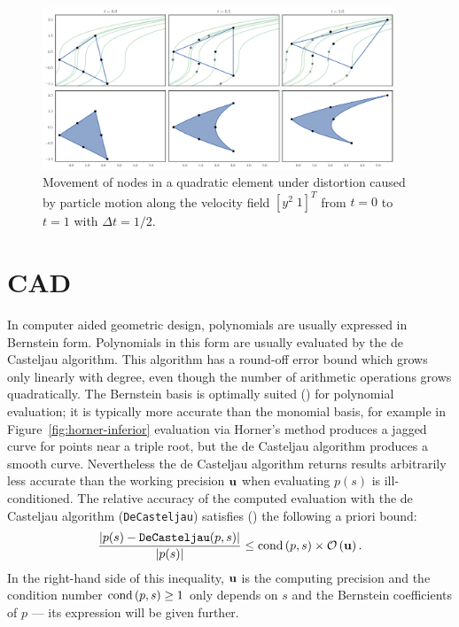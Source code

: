 \begin{figure}
  \includegraphics[width=0.9375\textwidth]
                  {../images/curved-mesh/element_distortion.pdf}
  \centering
  \caption{Movement of nodes in a quadratic element under distortion caused
    by particle motion along the velocity field \(\left[ y^2 \; 1 \right]^T\)
    from \(t = 0\) to \(t = 1\) with \(\Delta t = 1/2\).}
  \label{fig:element-distortion}
\end{figure}

\section{CAD}

In computer aided geometric design, polynomials are usually expressed in
Bernstein form. Polynomials in this form are usually evaluated by the
de Casteljau algorithm. This algorithm has a round-off error bound
which grows only linearly with degree, even though the number of
arithmetic operations grows quadratically. The Bernstein basis is
optimally suited (\cite{Farouki1987, Delgado2015, Mainar2005})
for polynomial evaluation; it is
typically more accurate than the monomial basis, for example in
Figure~\ref{fig:horner-inferior} evaluation via Horner's method produces
a jagged curve for points near a triple root, but the de Casteljau algorithm
produces a smooth curve. Nevertheless the de Casteljau
algorithm returns results arbitrarily less accurate than the working
precision \(\mathbf{u}\) when evaluating \(p(s)\) is ill-conditioned.
The relative accuracy of the computed
evaluation with the de Casteljau algorithm (\texttt{DeCasteljau}) satisfies
(\cite{Mainar1999}) the following a priori bound:
\begin{equation}\label{de-casteljau-error}
  \frac{\left|p(s) - \mathtt{DeCasteljau}(p, s)\right|}{\left|p(s)\right|} \leq
  \operatorname{cond}\left(p, s\right) \times \mathcal{O}\left(\mathbf{u}\right).
\end{equation}
In the right-hand side of this inequality, \(\mathbf{u}\) is the computing
precision and the condition number \(\operatorname{cond}\left(p, s\right) \geq 1\) only depends
on \(s\) and the Bernstein coefficients of \(p\) --- its expression will
be given further.

